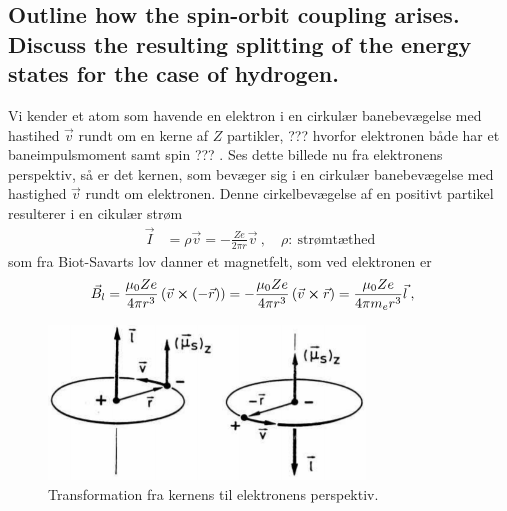 \subsection{Outline how the spin-orbit coupling arises. Discuss the resulting splitting of the energy states for the case of hydrogen.}


Vi kender et atom som havende en elektron i en cirkulær banebevægelse med hastihed $\Vec{v}$ rundt om en kerne af $Z$ partikler, ??? hvorfor elektronen både har et baneimpulsmoment samt spin ??? . Ses dette billede nu fra elektronens perspektiv, så er det kernen, som bevæger sig i en cirkulær banebevægelse med hastighed $\Vec{v}$ rundt om elektronen. Denne cirkelbevægelse af en positivt partikel resulterer i en cikulær strøm
\begin{align}
    \Vec{I} &= \rho \Vec{v} = - \frac{Z e}{2\pi r} \Vec{v} \: , \quad \rho: \: \text{strømtæthed}
\end{align}
som fra Biot-Savarts lov danner et magnetfelt, som ved elektronen er
\begin{align}
    \Vec{B}_l &= \frac{\mu_0 Z e}{4\pi r^3}\left(\Vec{v} \cross \left(-\Vec{r}\right)\right) = - \frac{\mu_0 Z e}{4\pi r^3}\left(\Vec{v} \cross \Vec{r}\right) = \frac{\mu_0 Z e}{4\pi m_e r^3}\Vec{l} \: ,
\end{align}

\begin{figure}[!h]
    \centering
    \includegraphics[width=0.75\textwidth]{Q10/images/SpinOrbiCouplingAtomFromDifferentPerspectives.PNG}
    \caption{Transformation fra kernens til elektronens perspektiv.}
    \label{fig:my_label}
\end{figure}